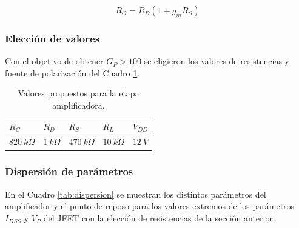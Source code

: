 \begin{multicols}{2}
        \begin{equation}
        R_O = R_D(1+g_mR_S)
        \end{equation}


        \subsubsection{Elección de valores}

        Con el objetivo de obtener $G_P > 100$ se eligieron los valores de resistencias y fuente de polarización del Cuadro \ref{tab:valores}.

        \begin{table}[h]
        \centering
        \begin{tabularx}{0.7\textwidth}{XXXXX}
        \hline
         $R_G$  		& $R_D$ 		& $R_S$ 			& $R_L$ 		& $V_{DD}$ \\
         \hline
         $820\ k\Omega$ & $1\ k\Omega$ 	& $470\ k\Omega$ 	& $10\ k\Omega$ & $12\ V$ \\
        \hline
        \end{tabularx}
        \caption{Valores propuestos para la etapa amplificadora.}
        \label{tab:valores}
        \end{table}



        \subsubsection{Dispersión de parámetros}

        En el Cuadro \ref{tab:dispersion} se muestran los distintos parámetros del amplificador y el punto de reposo para los valores extremos de los parámetros $I_{DSS}$ y $V_P$ del JFET con la elección de resistencias de la sección anterior.




\end{multicols}
